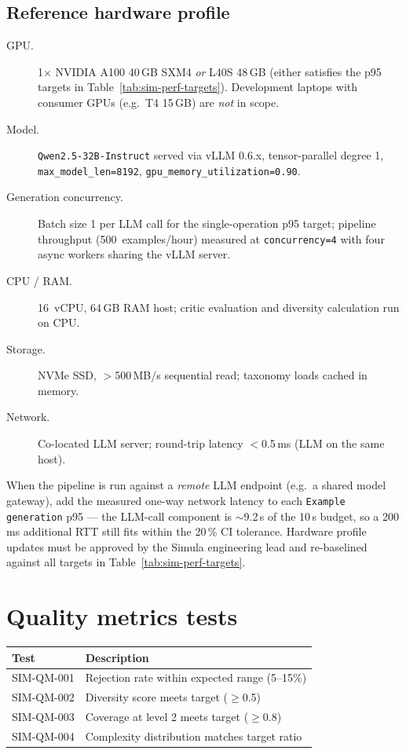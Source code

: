 \documentclass[12pt,a4paper,twoside]{report}
\begin{document}
\subsection{Reference hardware profile}
\label{sec:sim-perf-hardware}

\begin{description}
\item[GPU.] 1$\times$ NVIDIA A100 40\,GB SXM4 \emph{or} L40S 48\,GB
(either satisfies the p95 targets in
Table~\ref{tab:sim-perf-targets}). Development laptops with
consumer GPUs (e.g.\ T4 15\,GB) are \emph{not} in scope.
\item[Model.] \texttt{Qwen2.5-32B-Instruct} served via vLLM 0.6.x,
tensor-parallel degree 1, \texttt{max\_model\_len=8192},
\texttt{gpu\_memory\_utilization=0.90}.
\item[Generation concurrency.] Batch size 1 per LLM call for the
single-operation p95 target; pipeline throughput
(500~examples/hour) measured at \texttt{concurrency=4} with
four async workers sharing the vLLM server.
\item[CPU / RAM.] 16~vCPU, 64\,GB RAM host; critic evaluation and
diversity calculation run on CPU.
\item[Storage.] NVMe SSD, $>$500\,MB/s sequential read; taxonomy
loads cached in memory.
\item[Network.] Co-located LLM server; round-trip latency
$<$0.5\,ms (LLM on the same host).
\end{description}

\noindent
When the pipeline is run against a \emph{remote} LLM endpoint (e.g.\ a
shared model gateway), add the measured one-way network latency to each
\texttt{Example generation} p95 --- the LLM-call component is
$\sim$9.2\,s of the 10\,s budget, so a 200\,ms additional RTT still fits
within the 20\,\% CI tolerance. Hardware profile updates must be
approved by the Simula engineering lead and re-baselined against all
targets in Table~\ref{tab:sim-perf-targets}.

\section{Quality metrics tests}

\begin{tabularx}{\linewidth}{@{}l X@{}}
\toprule
\textbf{Test} & \textbf{Description} \\ \midrule
SIM-QM-001 & Rejection rate within expected range (5--15\%) \\
SIM-QM-002 & Diversity score meets target ($\geq$0.5) \\
SIM-QM-003 & Coverage at level 2 meets target ($\geq$0.8) \\
SIM-QM-004 & Complexity distribution matches target ratio \\
\bottomrule
\end{tabularx}
\end{document}
